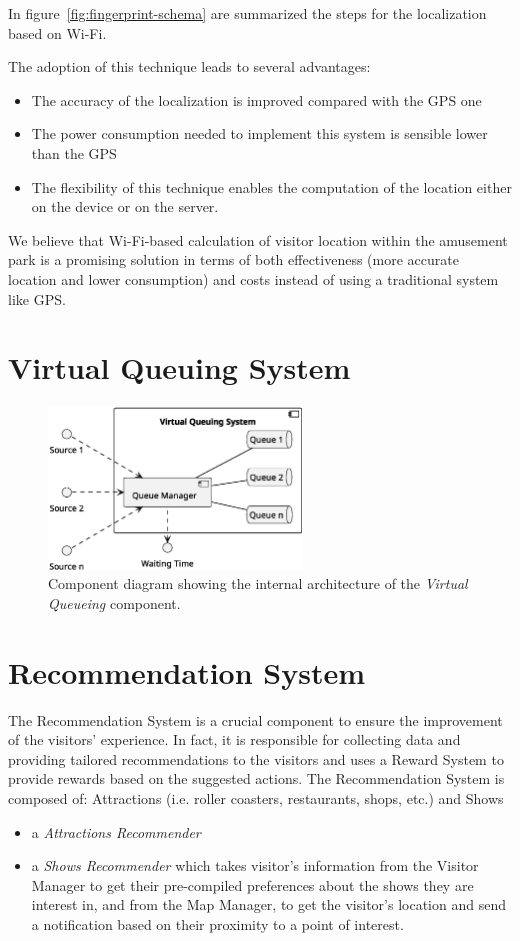 In figure~\ref{fig:fingerprint-schema} are summarized the steps for the localization based on Wi-Fi.

The adoption of this technique leads to several advantages:
\begin{itemize}
	\item The accuracy of the localization is improved compared with the GPS one~\cite{du2018hybrid}
	\item The power consumption needed to implement this system is sensible lower than the GPS~\cite{du2018hybrid}
	\item The flexibility of this technique enables the computation of the location either on the device or on the server.
\end{itemize}

We believe that Wi-Fi-based calculation of visitor location within the amusement park is a promising solution in terms of both effectiveness
(more accurate location and lower consumption) and costs instead of using a traditional system like GPS.


\section{Virtual Queuing System}
\begin{figure}[H]
	\centering
	\includegraphics[width=0.6\textwidth]{img/virtual-queuing.eps}
	\caption{Component diagram showing the internal architecture of the \textit{Virtual Queueing} component.
	}
	\label{fig:virtual-queueing-arch}
\end{figure}

\section{Recommendation System}
The Recommendation System is a crucial component to ensure the improvement of the visitors' experience.
In fact, it is responsible for collecting data and providing tailored recommendations to the visitors
and uses a Reward System to provide rewards based on the suggested actions.
The Recommendation System is composed of:
Attractions (i.e. roller coasters, restaurants, shops, etc.) and Shows
\begin{itemize}
	\item a \textit{Attractions Recommender}
	\item a \textit{Shows Recommender} which takes visitor's information from the Visitor Manager to get their pre-compiled preferences about the shows they are interest in, and from the Map Manager, to get the visitor's location and send a notification based on their proximity to a point of interest.
\end{itemize}


